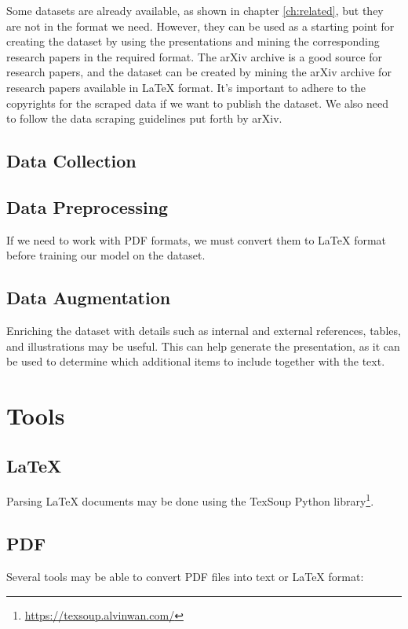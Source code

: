 Some datasets are already available, as shown in chapter \ref{ch:related}, but they are not in the format we need. However, they can be used as a starting point for creating the dataset by using the presentations and mining the corresponding research papers in the required format. The arXiv archive is a good source for research papers, and the dataset can be created by mining the arXiv archive for research papers available in \LaTeX{} format. It's important to adhere to the copyrights for the scraped data if we want to publish the dataset. We also need to follow the data scraping guidelines put forth by arXiv.

\subsection{Data Collection}

\subsection{Data Preprocessing}
If we need to work with PDF formats, we must convert them to \LaTeX{} format before training our model on the dataset. 

\subsection{Data Augmentation}
Enriching the dataset with details such as internal and external references, tables, and illustrations may be useful. This can help generate the presentation, as it can be used to determine which additional items to include together with the text.

\section{Tools}

\subsection{\LaTeX{}}
Parsing \LaTeX{} documents may be done using the TexSoup Python library\footnote{\url{https://texsoup.alvinwan.com/}}.

\subsection{PDF}
Several tools may be able to convert PDF files into text or \LaTeX{} format: 

